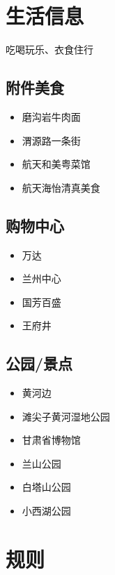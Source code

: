 \documentclass[
]{book}
\providecommand{\tightlist}{%
  \setlength{\itemsep}{0pt}\setlength{\parskip}{0pt}}
\begin{document}
\hypertarget{life}{%
\chapter{生活信息}\label{life}}

吃喝玩乐、衣食住行

\hypertarget{ux9644ux4ef6ux7f8eux98df}{%
\section{附件美食}\label{ux9644ux4ef6ux7f8eux98df}}

\begin{itemize}
\tightlist
\item
  磨沟岩牛肉面
\item
  渭源路一条街
\item
  航天和美粤菜馆
\item
  航天海怡清真美食
\end{itemize}

\hypertarget{ux8d2dux7269ux4e2dux5fc3}{%
\section{购物中心}\label{ux8d2dux7269ux4e2dux5fc3}}

\begin{itemize}
\tightlist
\item
  万达
\item
  兰州中心
\item
  国芳百盛
\item
  王府井
\end{itemize}

\hypertarget{ux516cux56edux666fux70b9}{%
\section{公园/景点}\label{ux516cux56edux666fux70b9}}

\begin{itemize}
\tightlist
\item
  黄河边
\item
  滩尖子黄河湿地公园
\item
  甘肃省博物馆
\item
  兰山公园
\item
  白塔山公园
\item
  小西湖公园
\end{itemize}

\hypertarget{rules}{%
\chapter{规则}\label{rules}}
\end{document}
